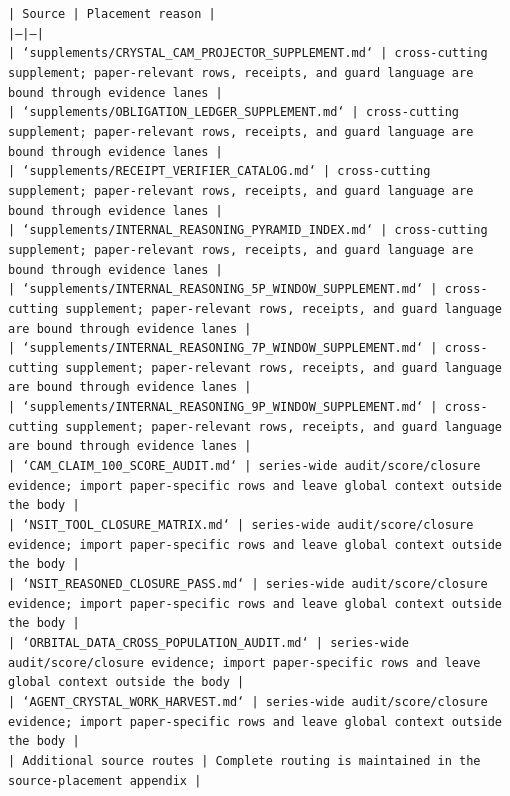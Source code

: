 \documentclass[11pt]{article}
\begin{document}
\noindent\texttt{| Source | Placement reason |}\\
\noindent\texttt{|---|---|}\\
\noindent\texttt{| `supplements/CRYSTAL\_CAM\_PROJECTOR\_SUPPLEMENT.md` | cross-cutting supplement; paper-relevant rows, receipts, and guard language are bound through evidence lanes |}\\
\noindent\texttt{| `supplements/OBLIGATION\_LEDGER\_SUPPLEMENT.md` | cross-cutting supplement; paper-relevant rows, receipts, and guard language are bound through evidence lanes |}\\
\noindent\texttt{| `supplements/RECEIPT\_VERIFIER\_CATALOG.md` | cross-cutting supplement; paper-relevant rows, receipts, and guard language are bound through evidence lanes |}\\
\noindent\texttt{| `supplements/INTERNAL\_REASONING\_PYRAMID\_INDEX.md` | cross-cutting supplement; paper-relevant rows, receipts, and guard language are bound through evidence lanes |}\\
\noindent\texttt{| `supplements/INTERNAL\_REASONING\_5P\_WINDOW\_SUPPLEMENT.md` | cross-cutting supplement; paper-relevant rows, receipts, and guard language are bound through evidence lanes |}\\
\noindent\texttt{| `supplements/INTERNAL\_REASONING\_7P\_WINDOW\_SUPPLEMENT.md` | cross-cutting supplement; paper-relevant rows, receipts, and guard language are bound through evidence lanes |}\\
\noindent\texttt{| `supplements/INTERNAL\_REASONING\_9P\_WINDOW\_SUPPLEMENT.md` | cross-cutting supplement; paper-relevant rows, receipts, and guard language are bound through evidence lanes |}\\
\noindent\texttt{| `CAM\_CLAIM\_100\_SCORE\_AUDIT.md` | series-wide audit/score/closure evidence; import paper-specific rows and leave global context outside the body |}\\
\noindent\texttt{| `NSIT\_TOOL\_CLOSURE\_MATRIX.md` | series-wide audit/score/closure evidence; import paper-specific rows and leave global context outside the body |}\\
\noindent\texttt{| `NSIT\_REASONED\_CLOSURE\_PASS.md` | series-wide audit/score/closure evidence; import paper-specific rows and leave global context outside the body |}\\
\noindent\texttt{| `ORBITAL\_DATA\_CROSS\_POPULATION\_AUDIT.md` | series-wide audit/score/closure evidence; import paper-specific rows and leave global context outside the body |}\\
\noindent\texttt{| `AGENT\_CRYSTAL\_WORK\_HARVEST.md` | series-wide audit/score/closure evidence; import paper-specific rows and leave global context outside the body |}\\
\noindent\texttt{| Additional source routes | Complete routing is maintained in the source-placement appendix |}\\
\end{document}

